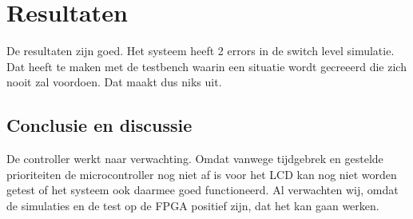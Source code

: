 \section{Resultaten}
De resultaten zijn goed. Het systeem heeft 2 errors in de switch level simulatie. Dat heeft te maken met de testbench waarin een situatie wordt gecre\¨eerd die zich nooit zal voordoen. Dat maakt dus niks uit.

\subsection{Conclusie en discussie}
De controller werkt naar verwachting. Omdat vanwege tijdgebrek en gestelde prioriteiten de microcontroller nog niet af is voor het LCD kan nog niet worden getest of het systeem ook daarmee goed functioneerd. Al verwachten wij, omdat de simulaties en de test op de FPGA positief zijn, dat het kan gaan werken.\\
